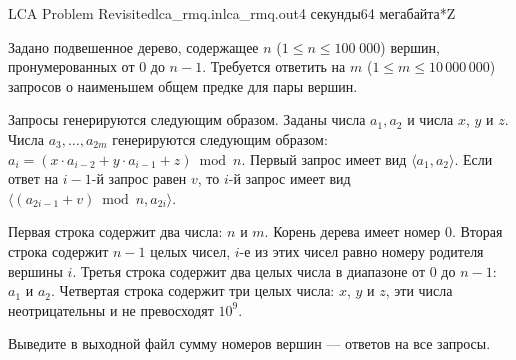 \begin{problem}{LCA Problem Revisited}{lca\_rmq.in}{lca\_rmq.out}{4 секунды}{64 мегабайта}{*Z}

Задано подвешенное дерево, содержащее $n$ ($1 \le n \le 100\;000$)
вершин, пронумерованных от 0 до $n - 1$. 
Требуется ответить на $m$ ($1 \le m \le 10\,000\,000$) запросов
о наименьшем общем предке для пары вершин.

Запросы генерируются следующим образом. Заданы числа
$a_1, a_2$ и числа $x$, $y$ и $z$. 
Числа $a_3, \ldots, a_{2m}$ генерируются
следующим образом: $a_i = (x\cdot a_{i-2}+y \cdot a_{i - 1} + z) \bmod n$.
Первый запрос имеет вид $\langle a_1, a_2\rangle$. Если ответ на $i-1$-й запрос
равен $v$, то $i$-й запрос имеет вид 
$\langle (a_{2i-1} + v) \bmod n, a_{2i}\rangle$.

\InputFile

Первая строка содержит два числа: $n$ и $m$. Корень дерева
имеет номер 0. Вторая строка содержит $n - 1$ целых чисел, $i$-е из этих
чисел равно номеру родителя вершины $i$.
Третья строка содержит два целых числа в диапазоне от 0 до $n - 1$: $a_1$ и $a_2$.
Четвертая строка содержит три целых числа: $x$, $y$ и $z$, эти числа неотрицательны
и не превосходят $10^9$.

\OutputFile

Выведите в выходной файл сумму номеров вершин --- ответов на все запросы.

\Examples

\begin{example}
%
\end{example}

\end{problem}
